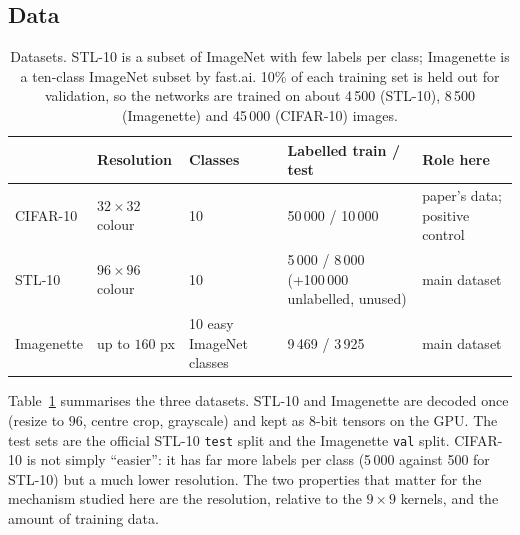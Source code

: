 \documentclass[11pt,a4paper]{article}
\begin{document}
\subsection{Data}
\begin{table}[b]
\centering\small
\begin{tabular}{p{1.9cm}p{2.5cm}p{2.5cm}p{4.2cm}p{3.0cm}}
\toprule
 & Resolution & Classes & Labelled train / test & Role here\\
\midrule
CIFAR-10 & $32{\times}32$ colour & 10 & 50\,000 / 10\,000 & paper's data; positive control\\
STL-10 & $96{\times}96$ colour & 10 & 5\,000 / 8\,000 (+100\,000 unlabelled, unused) & main dataset\\
Imagenette & up to $160$ px & 10 easy ImageNet classes & 9\,469 / 3\,925 & main dataset\\
\bottomrule
\end{tabular}
\caption{Datasets. STL-10 \cite{coates2011} is a subset of ImageNet with few labels per class; Imagenette is a ten-class ImageNet subset by fast.ai. 10\% of each training set is held out for validation, so the networks are trained on about 4\,500 (STL-10), 8\,500 (Imagenette) and 45\,000 (CIFAR-10) images.}\label{tab:data}
\end{table}
Table~\ref{tab:data} summarises the three datasets. STL-10 and Imagenette are decoded once (resize to $96$, centre crop, grayscale) and kept as 8-bit tensors on the GPU. The test sets are the official STL-10 \texttt{test} split and the Imagenette \texttt{val} split. CIFAR-10 is not simply ``easier'': it has far more labels per class (5\,000 against 500 for STL-10) but a much lower resolution. The two properties that matter for the mechanism studied here are the resolution, relative to the $9{\times}9$ kernels, and the amount of training data.
\end{document}

